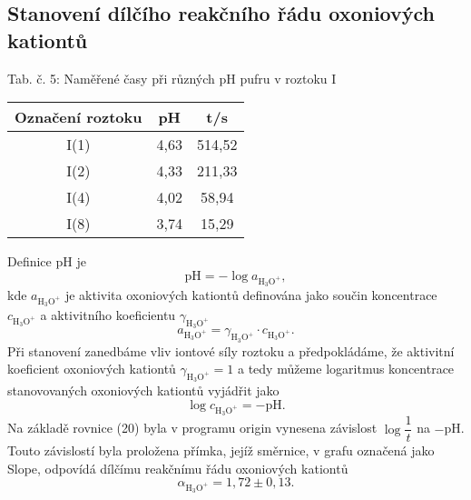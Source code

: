 \documentclass[12pt,a4paper]{article}
\def\ri#1{\mathrm{#1}}
\begin{document}
\subsection*{Stanovení dílčího reakčního řádu oxoniových kationtů}
\begin{center}
	\noindent Tab. č. 5: Naměřené časy při různých pH pufru v roztoku I\\
	\begin{tabular}{c|c|c}
		Označení roztoku & pH & t/s\\
		\hline
		I(1) & 4,63 & 514,52\\
		I(2) & 4,33 & 211,33\\
		I(4) & 4,02 & 58,94\\
		I(8) & 3,74 & 15,29\\
	\end{tabular}
\end{center}
Definice pH je
\begin{equation}
\ri{pH} = -\log a_\ri{H_3O^+},
\end{equation}
kde $a_\ri{H_3O^+}$ je aktivita oxoniových kationtů definována jako součin koncentrace $c_\ri{H_3O^+}$ a aktivitního koeficientu $\gamma_\ri{H_3O^+}$
\begin{equation}
 a_\ri{H_3O^+}=\gamma_\ri{H_3O^+} \cdot c_\ri{H_3O^+}.
\end{equation} 
Při stanovení zanedbáme vliv iontové síly roztoku a předpokládáme, že aktivitní koeficient oxoniových kationtů $\gamma_\ri{H_3O^+}=1$ a tedy můžeme logaritmus koncentrace stanovovaných oxoniových kationtů vyjádřit jako
\begin{equation}
	\log c_\ri{H_3O^+} = -\ri{pH}.
\end{equation}
Na základě rovnice (20) byla v programu origin vynesena závislost $\log \dfrac{1}{t}$ na $-$pH. Touto závislostí byla proložena přímka, jejíž směrnice, v grafu označená jako Slope, odpovídá dílčímu reakčnímu řádu oxoniových kationtů
\begin{equation}
\alpha_\ri{H_3O^+} = 1,72 \pm 0,13.
\end{equation}
\end{document}
